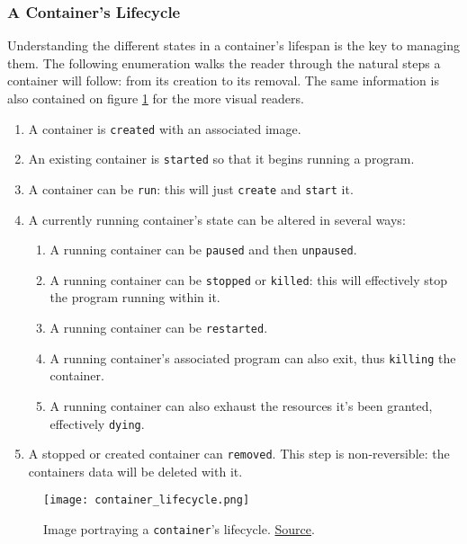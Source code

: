             \subsubsection{A Container's Lifecycle}
                Understanding the different states in a container's lifespan is the key to managing them. The following enumeration walks the reader through the natural steps a container will follow: from its creation to its removal. The same information is also contained on figure \ref{fig:container-lifecycle} for the more visual readers.

                \begin{enumerate}
                    \item A container is \texttt{created} with an associated image.
                    \item An existing container is \texttt{started} so that it begins running a program.
                    \item A container can be \texttt{run}: this will just \texttt{create} and \texttt{start} it.
                    \item A currently running container's state can be altered in several ways:
                    \begin{enumerate}
                        \item A running container can be \texttt{paused} and then \texttt{unpaused}.
                        \item A running container can be \texttt{stopped} or \texttt{killed}: this will effectively stop the program running within it.
                        \item A running container can be \texttt{restarted}.
                        \item A running container's associated program can also exit, thus \texttt{killing} the container.
                        \item A running container can also exhaust the resources it's been granted, effectively \texttt{dying}.
                    \end{enumerate}
                    \item A stopped or created container can \texttt{removed}. This step is non-reversible: the containers data will be deleted with it.
                \end{enumerate}

                \begin{figure}
                    \centering
                    \texttt{[image: container\_lifecycle.png]}
                    \caption{Image portraying a \texttt{container}'s lifecycle. \href{https://miro.medium.com/max/1129/1*vca4e-SjpzSL5H401p4LCg.png}{Source}.}
                    \label{fig:container-lifecycle}
                \end{figure}
